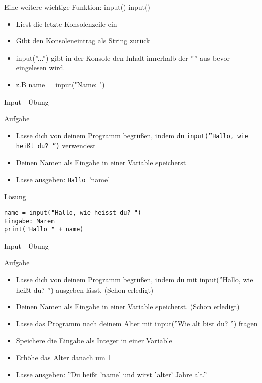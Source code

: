 \begin{frame}[fragile]{Eine weitere wichtige Funktion: input()}
input()
\begin{itemize}
\item Liest die letzte Konsolenzeile ein
\item Gibt den Konsoleneintrag als String zurück
\item input(''...'') gibt in der Konsole den Inhalt innerhalb der '''' aus bevor eingelesen wird.
\item z.B name = input("Name: ") 
\end{itemize}
\end{frame}

\begin{frame}[fragile]{Input - Übung}   
\begin{block}{Aufgabe}
\begin{itemize}


\item Lasse dich von deinem Programm begrüßen, indem du
  \texttt{input(''Hallo, wie heißt du? '')} verwendest
\item Deinen Namen als Eingabe in einer Variable speicherst 
\item Lasse ausgeben: \texttt{Hallo }'name'
\end{itemize}
\end{block}
\pause{}
\begin{exampleblock}{Lösung}
\begin{lstlisting}
name = input("Hallo, wie heisst du? ")
Eingabe: Maren
print("Hallo " + name)
\end{lstlisting}
\end{exampleblock}
\end{frame}

\begin{frame}[fragile]{Input - Übung}   
\begin{block}{Aufgabe}
	\begin{itemize}
		\item Lasse dich von deinem Programm begrüßen, indem du mit input(''Hallo, wie heißt du? '') ausgeben lässt. (Schon erledigt)
		\item Deinen Namen als Eingabe in einer Variable speicherst. (Schon erledigt)
		\item Lasse das Programm nach deinem Alter mit input(''Wie alt bist du? '') fragen
		\item Speichere die Eingabe als Integer in einer Variable 
		\item Erhöhe das Alter danach um 1
		\item Lasse ausgeben: ''Du heißt 'name' und wirst 'alter' Jahre alt.''
	\end{itemize}
\end{block}
\end{frame}


